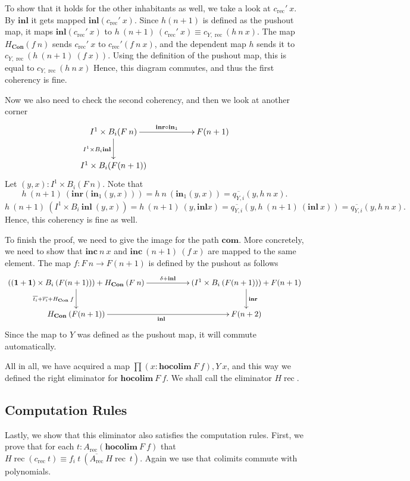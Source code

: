 \documentclass[a4paper,UKenglish]{lipics-v2016}
\newcommand{\Boperator}[1]{\mathrm{\mathbf{#1}}}
\newcommand{\inn}{\Boperator{in}}
\newcommand{\one}[0]{\textbf{1}}
\newcommand{\frec}[0]{\!\operatorname{rec}}
\newcommand{\rec}[0]{\operatorname{rec}}
\newcommand{\Con}[0]{\textbf{Con}}
\newcommand{\hocolim}[0]{\Boperator{hocolim}}
\newcommand{\inl}[0]{\Boperator{inl}}
\newcommand{\inr}[0]{\Boperator{inr}}
\newcommand{\inc}[0]{\Boperator{inc}}
\newcommand{\com}[0]{\Boperator{com}}
\begin{document}
To show that it holds for the other inhabitants as well, we take a look at $c_{\rec}' \> x$.
By $\inl$ it gets mapped $\inl (c_{\rec}' \> x)$.
Since $h(n+1)$ is defined as the pushout map, it maps $\inl (c_{\rec}' \> x)$ to $h \> (n+1) \> (c_{\rec}' \> x) \equiv c_{Y, \rec}(h \> n \> x)$.
The map $H_{\Con} (f \> n)$ sends $c_{\rec}' \> x$ to $c_{\rec}' (f \> n \> x)$, and the dependent map $h$ sends it to $c_{Y, \rec}(h \> (n+1) \> (f \> x))$.
Using the definition of the pushout map, this is equal to $c_{Y, \rec}(h \> n \> x)$
Hence, this diagram commutes, and thus the first coherency is fine.

Now we also need to check the second coherency, and then we look at another corner
\[
\xymatrix
{
	I^1 \times B_i (F \> n) \ar[rr]^-{\inr \circ \inn_1} \ar[d]_{I^1 \times B_i \inl} & & F(n+1)\\
	I^1 \times B_i(F(n+1)) 
}
\]
Let $(y, x) : I^1 \times B_i (F \> n)$.
Note that 
\[
h \> (n+1) \> (\inr(\inn_1 (y, x))) = h \> n \> (\inn_1 (y, x)) = \overline{q_{Y, i}}(y, h \> n \> x).
\]
\[
h \> (n+1) \> (I^1 \times B_i \> \inl \> (y, x)) = h \> (n+1) \> (y, \inl x) = \overline{q_{Y, i}}(y, h \> (n+1) \> (\inl \> x)) = \overline{q_{Y, i}}(y, h \> n \> x).
\]
Hence, this coherency is fine as well.




To finish the proof, we need to give the image for the path $\com$.
More concretely, we need to show that $\inc \> n \> x$ and $\inc \> (n+1) \> (f \> x)$ are mapped to the same element.
The map $f : F \> n \rightarrow F(n + 1)$ is defined by the pushout as follows
\[
\xymatrix
{
	((\one + \one) \times B_i \> (F(n+1))) + H_{\Con} \>  (F \> n) \ar[d]_{\overline{t_i} + \overline{r_i} + H_{\Con} \> f} \ar[rr]^-{\delta + \inl} & & (I^1 \times B_i \> (F(n+1))) + F(n+1)  \ar[d]^{\inr}\\
	H_{\Con} \> (F(n+1)) \ar[rr]_{\inl} & & F(n+2)
}
\]
Since the map to $Y$ was defined as the pushout map, it will commute automatically.

All in all, we have acquired a map $\prod (x : \hocolim \> F \> f), Y \> x$, and this way we defined the right eliminator for $\hocolim \> F \> f$.
We shall call the eliminator $H\frec$.

\subsection{Computation Rules}
Lastly, we show that this eliminator also satisfies the computation rules.
First, we prove that for each $t : A_{\rec}(\hocolim \> F \> f)$ that $H\frec(c_{\rec} \> t) \equiv f_i \> t \> (\overline{A_{\rec}} \> H\frec \> t)$.
Again we use that colimits commute with polynomials.
\end{document}
